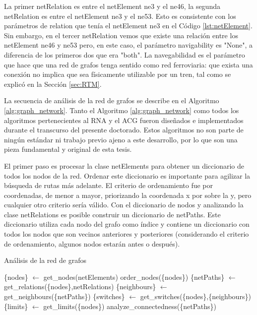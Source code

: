     La primer netRelation es entre el netElement ne3 y el ne46, la segunda netRelation es entre el netElement ne3 y el ne53. Esto es consistente con los parámetros de relation que tenía el netElement ne3 en el Código \ref{lst:netElement}. Sin embargo, en el tercer netRelation vemos que existe una relación entre los netElement ne46 y ne53 pero, en este caso, el parámetro navigability es "None", a diferencia de los primeros dos que era "both". La navegabilidad es el parámetro que hace que una red de grafos tenga sentido como red ferroviaria: que exista una conexión no implica que sea físicamente utilizable por un tren, tal como se explicó en la Sección \ref{sec:RTM}.
    
    La secuencia de análisis de la red de grafos se describe en el Algoritmo \ref{alg:graph_network}. Tanto el Algoritmo \ref{alg:graph_network} como todos los algoritmos pertenecientes al RNA y el ACG fueron diseñados e implementados durante el transcurso del presente doctorado. Estos algoritmos no son parte de ningún estándar ni trabajo previo ajeno a este desarrollo, por lo que son una pieza fundamental y original de esta tesis.    
    
    El primer paso es procesar la clase netElements para obtener un diccionario de todos los nodos de la red. Ordenar este diccionario es importante para agilizar la búsqueda de rutas más adelante. El criterio de ordenamiento fue por coordenadas, de menor a mayor, priorizando la coordenada x por sobre la y, pero cualquier otro criterio sería válido. Con el diccionario de nodos y analizando la clase netRelations es posible construir un diccionario de netPaths. Este diccionario utiliza cada nodo del grafo como índice y contiene un diccionario con todos los nodos que son vecinos anteriores y posteriores (considerando el criterio de ordenamiento, algunos nodos estarán antes o después).
    
        \begin{algorithm}
            \caption{Análisis de la red de grafos}
            \label{alg:graph_network}
            \begin{algorithmic}
                \STATE \{nodes\} $\gets$ get\_nodes(netElements)
                \STATE  order\_nodes(\{nodes\})
                \STATE \{netPaths\} $\gets$ get\_relations(\{nodes\},netRelations)
                \STATE \{neighbours\} $\gets$ get\_neighbours(\{netPaths\})
                \STATE \{switches\} $\gets$ get\_switches(\{nodes\},\{neighbours\})
                \STATE \{limits\} $\gets$ get\_limits(\{nodes\})
                \STATE analyze\_connectedness(\{netPaths\})
            \end{algorithmic}
        \end{algorithm}

